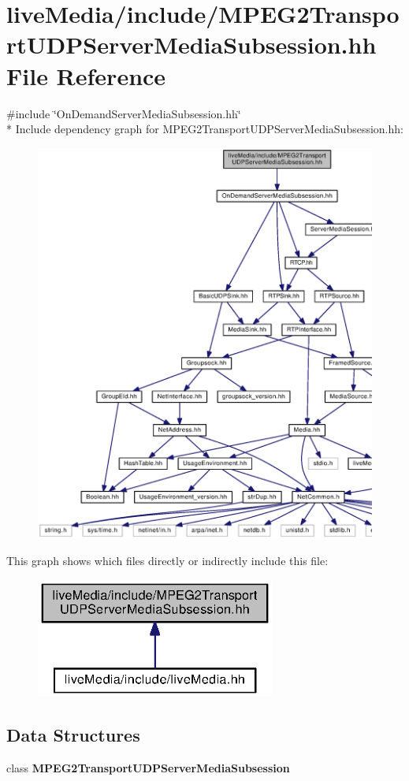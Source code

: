 \section{live\+Media/include/\+M\+P\+E\+G2\+Transport\+U\+D\+P\+Server\+Media\+Subsession.hh File Reference}
\label{MPEG2TransportUDPServerMediaSubsession_8hh}
{\ttfamily \#include \char`\"{}On\+Demand\+Server\+Media\+Subsession.\+hh\char`\"{}}\\*
Include dependency graph for M\+P\+E\+G2\+Transport\+U\+D\+P\+Server\+Media\+Subsession.\+hh\+:
\nopagebreak
\begin{figure}[H]
\begin{center}
\leavevmode
\includegraphics[width=350pt]{MPEG2TransportUDPServerMediaSubsession_8hh__incl}
\end{center}
\end{figure}
This graph shows which files directly or indirectly include this file\+:
\nopagebreak
\begin{figure}[H]
\begin{center}
\leavevmode
\includegraphics[width=223pt]{MPEG2TransportUDPServerMediaSubsession_8hh__dep__incl}
\end{center}
\end{figure}
\subsection*{Data Structures}
\begin{DoxyCompactItemize}
\item 
class {\bf M\+P\+E\+G2\+Transport\+U\+D\+P\+Server\+Media\+Subsession}
\end{DoxyCompactItemize}
